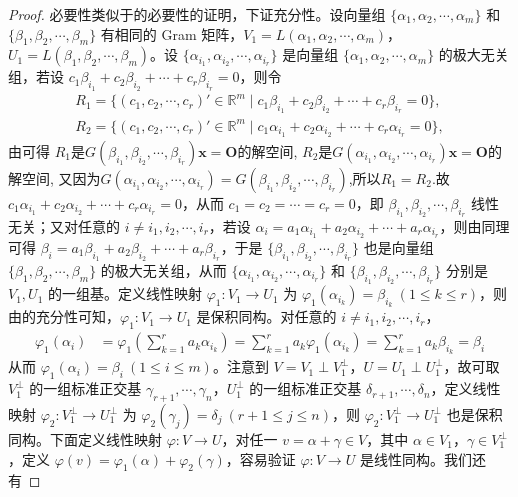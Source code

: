 \documentclass[../../main.tex]{subfiles}%
\begin{document}
\begin{proof}
必要性类似于的必要性的证明，下证充分性。设向量组 \(\{\alpha_1,\alpha_2,\cdots,\alpha_m\}\) 和 \(\{\beta_1,\beta_2,\cdots,\beta_m\}\) 有相同的 Gram 矩阵，\(V_1 = L(\alpha_1,\alpha_2,\cdots,\alpha_m)\)，\(U_1 = L(\beta_1,\beta_2,\cdots,\beta_m)\)。设 \(\{\alpha_{i_1},\alpha_{i_2},\cdots,\alpha_{i_r}\}\) 是向量组 \(\{\alpha_1,\alpha_2,\cdots,\alpha_m\}\) 的极大无关组，若设 \(c_1\beta_{i_1} + c_2\beta_{i_2} + \cdots + c_r\beta_{i_r} = 0\)，则令
\begin{align*}
R_1=\{(c_1,c_2,\cdots ,c_r)' \in \mathbb{R} ^m\mid c_1\beta _{i_1}+c_2\beta _{i_2}+\cdots +c_r\beta _{i_r}=0\},
\\
R_2=\{(c_1,c_2,\cdots ,c_r)' \in \mathbb{R} ^m\mid c_1\alpha _{i_1}+c_2\alpha _{i_2}+\cdots +c_r\alpha _{i_r}=0\},
\end{align*}
由可得 $R_1$是$G\left( \beta _{i_1},\beta _{i_2},\cdots ,\beta _{i_r} \right) \boldsymbol{x}=\boldsymbol{O}$的解空间,
$R_2$是$G\left( \alpha _{i_1},\alpha _{i_2},\cdots ,\alpha _{i_r} \right) \boldsymbol{x}=\boldsymbol{O}$的解空间,
又因为$G\left( \alpha _{i_1},\alpha _{i_2},\cdots ,\alpha _{i_r} \right) =G\left( \beta _{i_1},\beta _{i_2},\cdots ,\beta _{i_r} \right)$,所以$R_1=R_2$.故\(c_1\alpha_{i_1} + c_2\alpha_{i_2} + \cdots + c_r\alpha_{i_r} = 0\)，从而 \(c_1 = c_2 = \cdots = c_r = 0\)，即 \(\beta_{i_1},\beta_{i_2},\cdots,\beta_{i_r}\) 线性无关；又对任意的 \(i \neq i_1,i_2,\cdots,i_r\)，若设 \(\alpha_i = a_1\alpha_{i_1} + a_2\alpha_{i_2} + \cdots + a_r\alpha_{i_r}\)，则由同理可得 \(\beta_i = a_1\beta_{i_1} + a_2\beta_{i_2} + \cdots + a_r\beta_{i_r}\)，于是 \(\{\beta_{i_1},\beta_{i_2},\cdots,\beta_{i_r}\}\) 也是向量组 \(\{\beta_1,\beta_2,\cdots,\beta_m\}\) 的极大无关组，从而 \(\{\alpha_{i_1},\alpha_{i_2},\cdots,\alpha_{i_r}\}\) 和 \(\{\beta_{i_1},\beta_{i_2},\cdots,\beta_{i_r}\}\) 分别是 \(V_1,U_1\) 的一组基。定义线性映射 \(\varphi_1:V_1 \to U_1\) 为 \(\varphi_1(\alpha_{i_k}) = \beta_{i_k}\ (1\leqslant  k \leqslant  r)\)，则由的充分性可知，\(\varphi_1:V_1 \to U_1\) 是保积同构。对任意的 \(i \neq i_1,i_2,\cdots,i_r\)，
\begin{align*}
\varphi_1(\alpha_i) &= \varphi_1\left(\sum_{k = 1}^{r}a_k\alpha_{i_k}\right) = \sum_{k = 1}^{r}a_k\varphi_1(\alpha_{i_k}) = \sum_{k = 1}^{r}a_k\beta_{i_k} = \beta_i
\end{align*}
从而 \(\varphi_1(\alpha_i) = \beta_i\ (1\leqslant  i \leqslant  m)\)。注意到 \(V = V_1 \perp V_1^{\perp}\)，\(U = U_1 \perp U_1^{\perp}\)，故可取 \(V_1^{\perp}\) 的一组标准正交基 \(\gamma_{r + 1},\cdots,\gamma_n\)，\(U_1^{\perp}\) 的一组标准正交基 \(\delta_{r + 1},\cdots,\delta_n\)，定义线性映射 \(\varphi_2:V_1^{\perp} \to U_1^{\perp}\) 为 \(\varphi_2(\gamma_j) = \delta_j\ (r + 1\leqslant  j \leqslant  n)\)，则 \(\varphi_2:V_1^{\perp} \to U_1^{\perp}\) 也是保积同构。下面定义线性映射 \(\varphi:V \to U\)，对任一 \(v = \alpha + \gamma \in V\)，其中 \(\alpha \in V_1\)，\(\gamma \in V_1^{\perp}\)，定义 \(\varphi(v) = \varphi_1(\alpha) + \varphi_2(\gamma)\)，容易验证 \(\varphi:V \to U\) 是线性同构。我们还有

\end{proof}
\end{document}
